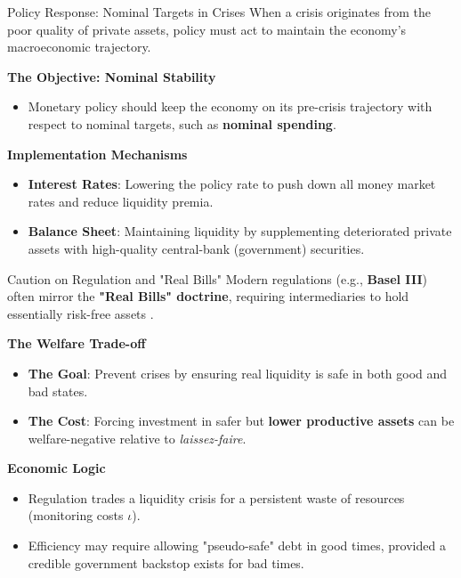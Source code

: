 \documentclass[11pt,aspectratio=169]{beamer}
\begin{document}
\begin{frame}{Policy Response: Nominal Targets in Crises}
\small
When a crisis originates from the poor quality of private assets, policy must act to maintain the economy's macroeconomic trajectory.

\vspace{0.3cm}
\textbf{The Objective: Nominal Stability}
\begin{itemize}
    \item Monetary policy should keep the economy on its pre-crisis trajectory with respect to nominal targets, such as \textbf{nominal spending}.
\end{itemize}

\vspace{0.3cm}
\textbf{Implementation Mechanisms}
\begin{itemize}
    \item \textbf{Interest Rates}: Lowering the policy rate to push down all money market rates and reduce liquidity premia.
    \item \textbf{Balance Sheet}: Maintaining liquidity by supplementing deteriorated private assets with high-quality central-bank (government) securities.
\end{itemize}
\end{frame}

\begin{frame}{Caution on Regulation and "Real Bills"}
\small
Modern regulations (e.g., \textbf{Basel III}) often mirror the \textbf{"Real Bills" doctrine}, requiring intermediaries to hold essentially risk-free assets \parencite{sargent2011}.

\vspace{0.3cm}
\textbf{The Welfare Trade-off}
\begin{itemize}
    \item \textbf{The Goal}: Prevent crises by ensuring real liquidity is safe in both good and bad states.
    \item \textbf{The Cost}: Forcing investment in safer but \textbf{lower productive assets} can be welfare-negative relative to \textit{laissez-faire}.
\end{itemize}

\vspace{0.3cm}
\textbf{Economic Logic}
\begin{itemize}
    \item Regulation trades a liquidity crisis for a persistent waste of resources (monitoring costs $\iota$).
    \item Efficiency may require allowing "pseudo-safe" debt in good times, provided a credible government backstop exists for bad times.
\end{itemize}
\end{frame}
\end{document}
